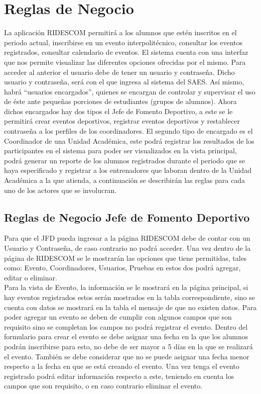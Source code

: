 	\section{Reglas de Negocio}
	\noindent La aplicación RIDESCOM permitirá a los alumnos que estén inscritos en el periodo actual, inscribirse en un evento interpolitécnico, consultar los eventos registrados, consultar calendario de eventos. 
	El sistema cuenta con una interfaz que nos permite visualizar las diferentes opciones ofrecidas por el mismo. Para acceder al anterior el usuario debe de tener un usuario y contraseña. Dicho usuario y contraseña, será con el que ingresa al sistema del SAES. 
	Así mismo, habrá “usuarios encargados”, quienes se encargan de controlar y supervisar el uso de éste ante pequeñas porciones de estudiantes (grupos de alumnos). Ahora dichos encargados hay dos tipos el Jefe de Fomento Deportivo, a este se le permitirá crear eventos deportivos, registrar eventos deportivos y restablecer contraseña a los perfiles de los coordinadores. El segundo tipo de encargado es el Coordinador de una Unidad Académica, este podrá registrar los resultados de los participantes en el sistema para poder ser visualizados en la vista principal, podrá generar un reporte de los alumnos registrados durante el periodo que se haya especificado y registrar a los entrenadores que laboran dentro de la Unidad Académica a la que atienda, a continuación se describirán las reglas para cada uno de los actores que se involucran.
	
	\subsection{Reglas de Negocio Jefe de Fomento Deportivo}
	Para que el JFD pueda ingresar a la página RIDESCOM debe de contar con un Usuario y Contraseña, de caso contrario no podrá acceder.
	Una vez dentro de la página de RIDESCOM se le mostrarán las opciones que tiene permitidas, tales como: Evento, Coordinadores, Usuarios, Pruebas en estos dos podrá agregar, editar o eliminar. \\
	
	Para la vista de Evento, la información se le mostrará en la página principal, si hay eventos registrados estos serán mostrados en la tabla correspondiente, sino se cuenta con datos se mostrará en la tabla el mensaje de que no existen datos.  Para poder agregar un evento se deben de cumplir con algunos campos que son requisito sino se completan los campos no podrá registrar el evento.  Dentro del formulario para crear el evento se debe asignar una fecha en la que los alumnos podrán inscribirse para esto, no debe de ser mayor  a 5 días en la que se realizará el evento. También se debe considerar que no se puede asignar una fecha menor respecto a la fecha en que se está creando el evento. Una vez tenga el evento registrado podrá editar información respecto a este, teniendo en cuenta los campos que son requisito, o en caso contrario eliminar el evento.\\
	
